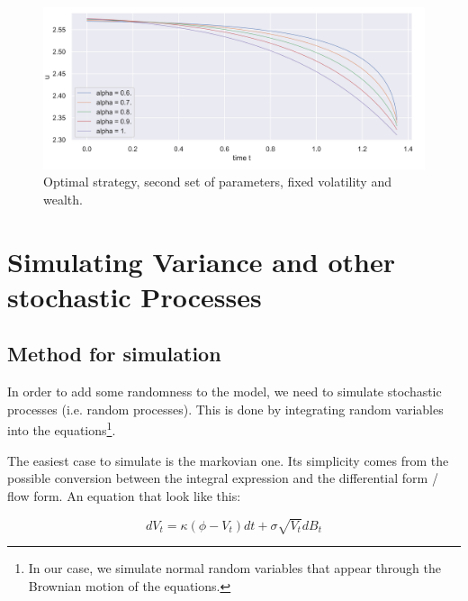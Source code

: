 \begin{figure}
\centering
\includegraphics[width = 0.7 \textwidth]{../addition_part/images/numerical_studies/2b.png}
\caption{Optimal strategy, second set of parameters, fixed volatility and wealth.}
\label{fig:2B}
\end{figure}

































\section{Simulating Variance and other stochastic Processes }
\label{processes}

\subsection{Method for simulation}

In order to add some randomness to the model, we need to simulate stochastic processes (i.e. random processes). This is done by integrating random variables into the equations\footnote{In our case, we simulate normal random variables that appear through the Brownian motion of the equations.}.

The easiest case to simulate is the markovian one. Its simplicity comes from the possible conversion between the integral expression and the differential form / flow form. 
An equation that look like this:


$$
d V_t = \kappa  (  \phi - V_t ) dt + \sigma \sqrt{V_t} dB_t 
$$

